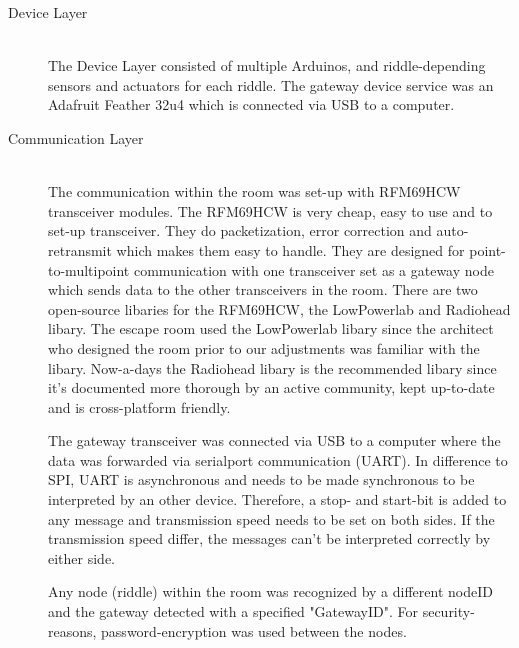 \begin{description}
	\item[Device Layer]\hfill \\
	      The Device Layer consisted of multiple Arduinos, and riddle-depending sensors and actuators for each riddle.
	      The gateway device service was an Adafruit Feather 32u4 which is connected via USB to a computer.
	\item[Communication Layer]\hfill \\
	      The communication within the room was set-up with RFM69HCW transceiver modules.\parencite{radiorange}
          The RFM69HCW is very cheap, easy to use and to set-up transceiver. They do packetization, error correction and auto-retransmit which makes them easy to handle.
	      They are designed for point-to-multipoint communication with one transceiver set as a gateway node which sends data to the other transceivers in the room.
	      There are two open-source libaries for the RFM69HCW, the LowPowerlab \parencite{LowPowerLab} and Radiohead \parencite{radiohead} libary.
	      The escape room used the LowPowerlab libary since the architect who designed the room prior to our adjustments was familiar with the libary.
          Now-a-days the Radiohead libary is the recommended libary \parencite{adafruitRecommends} since it's documented more thorough by an active community, kept up-to-date and is cross-platform friendly.
         
          The gateway transceiver was connected via USB to a computer where the data was forwarded via serialport communication (UART).
          In difference to SPI, UART is asynchronous and needs to be made synchronous to be interpreted by an other device. 
          Therefore, a stop- and start-bit is added to any message and transmission speed needs to be set on both sides.
          If the transmission speed differ, the messages can't be interpreted correctly by either side.
            
          Any node (riddle) within the room was recognized by a different nodeID and the gateway detected with a specified "GatewayID". 
        For security-reasons, password-encryption was used between the nodes. 


\end{description}
